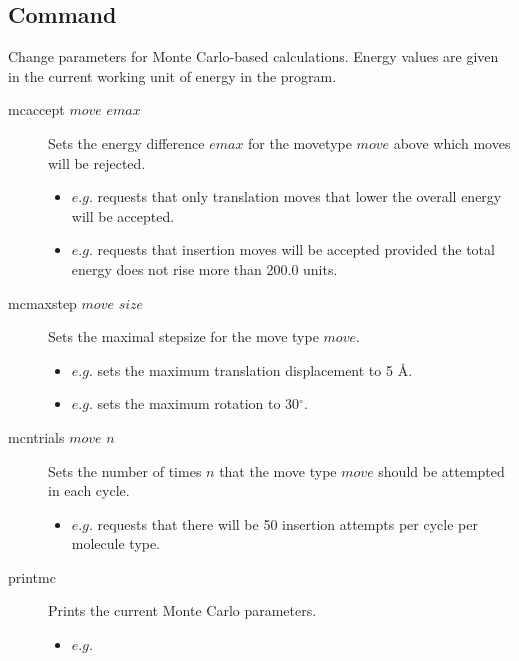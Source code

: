 \subsection{Command }
Change parameters for Monte Carlo-based calculations. Energy values are given in the current working unit of energy in the program.\\
\begin{description}

	\item[mcaccept $move$ $emax$\its] Sets the energy difference $emax$ for the movetype $move$ above which moves will be rejected.
	\begin{itemize}
		\item $e.g.$  requests that only translation moves that lower the overall energy will be accepted.
		\item $e.g.$  requests that insertion moves will be accepted provided the total energy does not rise more than 200.0 units.
	\end{itemize}

	\item[mcmaxstep $move$ $size$\its] Sets the maximal stepsize for the move type $move$.
	\begin{itemize}
		\item $e.g.$  sets the maximum translation displacement to 5 \AA.
		\item $e.g.$  sets the maximum rotation to 30$^\circ$.
	\end{itemize}

	\item[mcntrials $move$ $n$\its] Sets the number of times $n$ that the move type $move$ should be attempted in each cycle.
	\begin{itemize}
		\item $e.g.$  requests that there will be 50 insertion attempts per cycle per molecule type.
	\end{itemize}

	\item[printmc\its] Prints the current Monte Carlo parameters.
	\begin{itemize}
		\item $e.g.$ 
	\end{itemize}

\end{description}


